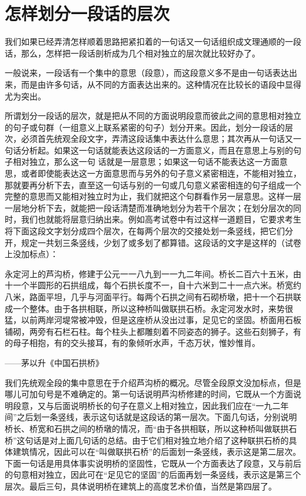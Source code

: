 \section{怎样划分一段话的层次}

我们如果已经弄清怎样顺着思路把紧扣着的一句话又一句话组织成文理通顺的一段话，那么，怎样把一段话剖析成为几个相对独立的层次就比较好办了。

一般说来，一段话有一个集中的意思（段意），而这段意义多不是由一句话表达出来，而是由许多句话，从不同的方面表达出来的。这种情况在比较长的语段中显得尤为突出。

所谓划分一段话的层次，就是把从不同的方面说明段意而彼此之间的意思相对独立的句子或句群（一组意义上联系紧密的句子）划分开来。因此，划分一段话的层次，必须首先统观全段文字，弄清这段话集中表达什么意思；其次再从一句话又一句话分析起。如果这一句话就能表达这段话的一方面意义，而且在意思上与别的句子相对独立，那么这一句
话就是一层意思；如果这一句话不能表达这一方面意思，或者即使能表达这一方面意思而与另外的句子意义紧密相连，不能相对独立，那就要再分析下去，直至这一句话与别的一句或几句意义紧密相连的句子组成一个完整的意思而又能相对独立时为止，我们就把这个句群看作另一层意思。这样一层一层地分析下去，就能把一段话清楚而准确地划分为若干个层次；在划分层次的同时，我们也就能将层意归纳出来。例如高考试卷中有过这样一道题目，它要求考生将下面这段文字划分成四个层次，在每两个层次的交接处划一条竖线，把它们分开，规定一共划三条竖线，少划了或多划了都算错。这段话的文字是这样的（试卷上没加标点）：

永定河上的芦沟桥，修建于公元一一八九到一一九二年间。桥长二百六十五米，由十一个半圆形的石拱组成，每个石拱长度不一，自十六米到二十一点六米。桥宽约八米，路面平坦，几乎与河面平行。每两个石拱之间有石砌桥墩，把十一个石拱联成一个整体。由于各拱相联，所以这种桥叫做联拱石桥。永定河发水时，来势很猛，以前两岸河堤常被冲毁，但是这座桥从没出过事，足见它的坚固。桥面用石板铺砌，两旁有石栏石柱。每个柱头上都雕刻着不同姿态的狮子。这些石刻狮子，有的母子相抱，有的交头接耳，有的象倾听水声，千态万状，惟妙惟肖。
\begin{flushright}
——茅以升《中国石拱桥》
\end{flushright}

我们先统观全段的集中意思在于介绍芦沟桥的概况。尽管全段原文没加标点，但是哪儿可加句号是不难确定的。第一句话说明芦沟桥修建的时间，它既从一个方面说明段意，又与后面说明桥长的句子在意义上相对独立，因此我们应在“一九二年间”之后划一条竖线，表示这句话就是这段话的第一层次。下面几句话，分别说明桥长、桥宽和石拱之间的桥墩的情况，而“由于各拱相联，所以这种桥叫做联拱石桥”这句话是对上面几句话的总结。由于它们相对独立地介绍了这种联拱石桥的具体建筑情况，因此可以在“叫做联拱石桥”的后面划一条竖线，表示这是第二层次。下面一句话是用具体事实说明桥的坚固性，它既从一个方面表达了段意，又与前后的句意相对独立，因此可在“足见它的坚固”的后面再划一条竖线，表示这是第三个层次。最后三句，具体说明桥在建筑上的高度艺术价值，当然是第四层了。

